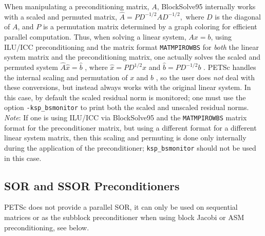 When manipulating a preconditioning matrix, $ A $, BlockSolve95
internally works with a scaled and permuted matrix, $ \hat{A} = P
D^{-1/2} A D^{-1/2},$ where $ D $ is the diagonal of $ A $, and $ P $ is a
permutation matrix determined by a graph coloring for efficient
parallel computation.  Thus, when solving a linear system, $ Ax=b $,
using ILU/ICC preconditioning and the matrix format {\tt MATMPIROWBS}
for {\em both} the linear system matrix and the preconditioning
matrix, one actually solves the scaled and permuted system $ \hat{A}
\hat{x} = \hat{b} $ , where $ \hat{x} = P D^{1/2} x $ and $\hat{b} = P
D^{-1/2} b$ .  PETSc handles the internal scaling and permutation of
$ x $ and $ b $ , so the user does {\em not} deal with these conversions, 
but instead always works with the original linear system.  In
this case, by default the scaled residual norm is monitored; one must use the
option {\tt -ksp\_bsmonitor}  to print both the
scaled and unscaled residual norms. {\em Note}: If one is using ILU/ICC via
BlockSolve95 and the {\tt MATMPIROWBS} matrix format for the 
preconditioner matrix, but using a different format for a different
linear system matrix, then this scaling and permuting is done only
internally during the application of the preconditioner; 
{\tt ksp\_bsmonitor} should not be used in this case.



\subsection{SOR and SSOR Preconditioners}

PETSc does not provide a parallel SOR, it can only be used on sequential 
matrices or as the subblock preconditioner when using block Jacobi or 
ASM preconditioning, see below.

